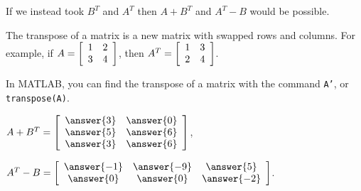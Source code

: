 \documentclass{ximera}
\begin{document}
\begin{exercise}
\begin{enumerate}
        \begin{problem}
        If we instead took $B^T$ and $A^T$ then $A+B^T$ and $A^T-B$ would be possible.

        \begin{hint}
        
          The transpose of a matrix is a new matrix with swapped rows and columns. For example, if $A = \startmat{cc} 1 & 2 \\ 3 & 4 \stopmat$, then $A^T = \startmat{cc} 1 & 3 \\ 2 & 4 \stopmat$.

          In MATLAB, you can find the transpose of a matrix with the command \texttt{A'}, or \texttt{transpose(A)}.
        \end{hint}
  
        $A+B^T = \startmat{cc}
          \answer{3} & \answer{0}  \\
          \answer{5} & \answer{6}  \\
          \answer{3} & \answer{6} 
        \stopmat$,\quad

        $A^T-B = \startmat{ccc}
          \answer{-1} & \answer{-9} & \answer{5} \\
          \answer{0} & \answer{0} & \answer{-2}
        \stopmat$.

        \end{problem}

  \end{enumerate}
\end{exercise}
\end{document}
